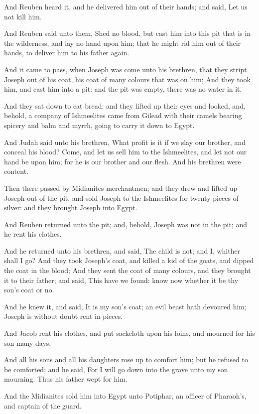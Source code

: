 \verse And Reuben heard it, and he delivered him out of their hands;
and said, Let us not kill him.

\verse And Reuben said unto them, Shed no blood, but cast him into this
pit that is in the wilderness, and lay no hand upon him; that he might
rid him out of their hands, to deliver him to his father again.

\verse And it came to pass, when Joseph was come unto his brethren,
that they stript Joseph out of his coat, his coat of many colours that
was on him; \verse And they took him, and cast him into a pit: and the
pit was empty, there was no water in it.

\verse And they sat down to eat bread: and they lifted up their eyes
and looked, and, behold, a company of Ishmeelites came from Gilead
with their camels bearing spicery and balm and myrrh, going to carry
it down to Egypt.

\verse And Judah said unto his brethren, What profit is it if we slay
our brother, and conceal his blood?  \verse Come, and let us sell him
to the Ishmeelites, and let not our hand be upon him; for he is our
brother and our flesh. And his brethren were content.

\verse Then there passed by Midianites merchantmen; and they drew and
lifted up Joseph out of the pit, and sold Joseph to the Ishmeelites
for twenty pieces of silver: and they brought Joseph into Egypt.

\verse And Reuben returned unto the pit; and, behold, Joseph was not in
the pit; and he rent his clothes.

\verse And he returned unto his brethren, and said, The child is not;
and I, whither shall I go?  \verse And they took Joseph's coat, and
killed a kid of the goats, and dipped the coat in the blood; \verse And
they sent the coat of many colours, and they brought it to their
father; and said, This have we found: know now whether it be thy son's
coat or no.

\verse And he knew it, and said, It is my son's coat; an evil beast
hath devoured him; Joseph is without doubt rent in pieces.

\verse And Jacob rent his clothes, and put sackcloth upon his loins,
and mourned for his son many days.

\verse And all his sons and all his daughters rose up to comfort him;
but he refused to be comforted; and he said, For I will go down into
the grave unto my son mourning. Thus his father wept for him.

\verse And the Midianites sold him into Egypt unto Potiphar, an officer
of Pharaoh's, and captain of the guard.

